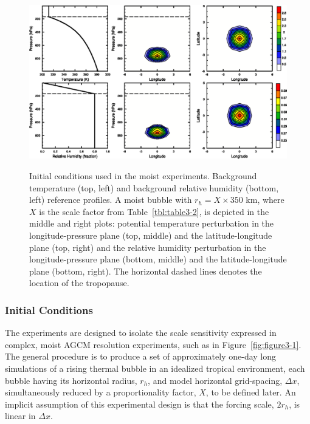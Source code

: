 \begin{figure}
\begin{center}
\noindent\includegraphics[width=30pc,angle=0]{chapter3/Figure2.eps}\\
\end{center}
\caption{Initial conditions used in the moist experiments. Background temperature (top, left) and background relative humidity (bottom, left) reference profiles.  A moist bubble with $r_h = X \times 350$ km, where $X$ is the scale factor from Table~\ref{tbl:table3-2}, is depicted in the middle and right plots: potential temperature perturbation in the longitude-pressure plane (top, middle) and the latitude-longitude plane (top, right) and the relative humidity perturbation in the longitude-pressure plane (bottom, middle) and the latitude-longitude plane (bottom, right). The horizontal dashed lines denotes the location of the tropopause.}
\label{fig:figure3-2}
\end{figure}

\subsubsection*{Initial Conditions}
The experiments are designed to isolate the scale sensitivity expressed in complex, moist AGCM resolution experiments, such as in Figure~\ref{fig:figure3-1}. The general procedure is to produce a set of approximately one-day long simulations of a rising thermal bubble in an idealized tropical environment, each bubble having its horizontal radius, $r_h$, and model horizontal grid-spacing, $\Delta x$, simultaneously reduced by a proportionality factor, $X$, to be defined later. An implicit assumption of this experimental design is that the forcing scale, $2 r_h$, is linear in $\Delta x$. 

